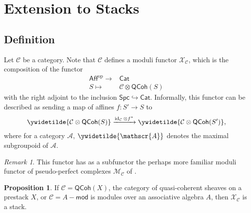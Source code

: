 \documentclass{article}
\numberwithin{equation}{section}
\theoremstyle{quest}
\theoremstyle{definition}
\newtheorem{prop}[thm]{Proposition}
\theoremstyle{remark}
\newtheorem{rmk}[thm]{Remark}
\newcommand{\msf}{\mathsf}
\newcommand{\Mod}{-\msf{mod}}
\DeclareMathOperator{\id}{id}
\begin{document}
\section{Extension to Stacks}\label{sec:ext-to-stacks}
	
\subsection{Definition}
Let $ \mathcal{C}$ be a category. Note that $\mathcal{C}$ defines a moduli functor $\mathcal{X}_{\mathcal{C}}$, which is the composition of the functor
\begin{align*}
	\mathsf{Aff}^{\text{op}}\to& \mathsf{Cat}\\
	S\mapsto &\mathcal{C}\otimes \mathsf{QCoh}(S)
\end{align*} 
with the right adjoint to the inclusion $\mathsf{Spc}\hookrightarrow \mathsf{Cat}$. Informally, this functor can be described as sending a map of affines $f:S'\to S$ to 
\begin{align*}
\ywidetilde{\mathcal{C}\otimes \mathsf{QCoh}(S)}\xrightarrow{\id_{\mathcal{C}}\otimes f^*}\ywidetilde{\mathcal{C}\otimes \mathsf{QCoh}(S')},
\end{align*}
where for a category $\mathscr{A}$, $\ywidetilde{\mathscr{A}}$ denotes the maximal subgroupoid of $\mathscr{A}$.
\begin{rmk}
This functor has as a subfunctor the perhaps more familiar moduli functor of pseudo-perfect complexes $\mathscr{M}_{\mathcal{C}}$ of \cite{TV}.
\end{rmk}
\begin{prop}
	If $\mathcal{C}=\mathsf{QCoh}(X)$, the category of quasi-coherent sheaves on a prestack $X$, or $\mathcal{C}=A\Mod$ is modules over an associative algebra $A$, then $\mathcal{X}_{\mathcal{C}}$ is a stack.
\end{prop} 
\end{document}
